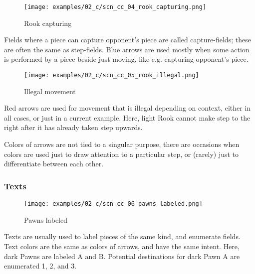 \vspace*{13.7\baselineskip}
\noindent
\begin{wrapfigure}[8]{l}{0.4\textwidth}
\centering
\texttt{[image: examples/02\_c/scn\_cc\_04\_rook\_capturing.png]}
\vspace*{-1.4\baselineskip}
\caption{Rook capturing}
\label{fig:scn_cc_04_rook_capturing}
\end{wrapfigure}
Fields where a piece can capture opponent's piece are called capture-fields;
these are often the same as step-fields. \newline
\indent
Blue arrows are used mostly when some action is performed by a piece beside just
moving, like e.g. capturing opponent's piece.

\clearpage %

\vspace*{-1.4\baselineskip}
\noindent
\begin{wrapfigure}[13]{l}{0.4\textwidth}
\centering
\texttt{[image: examples/02\_c/scn\_cc\_05\_rook\_illegal.png]}
\vspace*{-1.4\baselineskip}
\caption{Illegal movement}
\label{fig:scn_cc_05_rook_illegal}
\end{wrapfigure}
Red arrows are used for movement that is illegal depending on context, either
in all cases, or just in a current example. \newline
\indent
Here, light Rook cannot make step to the right after it has already taken step
upwards.

Colors of arrows are not tied to a singular purpose, there are occasions when
colors are used just to draw attention to a particular step, or (rarely) just
to differentiate between each other.


\subsubsection*{Texts}
\label{sec:Classical Chess/Chessboard/Examples/Texts}

\vspace*{-0.7\baselineskip}
\noindent
\begin{wrapfigure}[9]{l}{0.4\textwidth}
\centering
\texttt{[image: examples/02\_c/scn\_cc\_06\_pawns\_labeled.png]}
\vspace*{-1.4\baselineskip}
\caption{Pawns labeled}
\label{fig:scn_cc_06_pawns_labeled}
\end{wrapfigure}
Texts are usually used to label pieces of the same kind, and enumerate fields.
Text colors are the same as colors of arrows, and have the same intent. \newline
\indent
Here, dark Pawns are labeled A and B. Potential destinations for dark Pawn A are
enumerated 1, 2, and 3.

